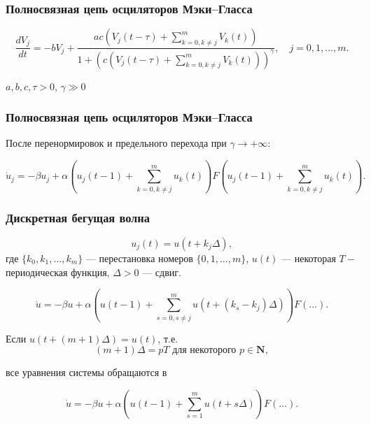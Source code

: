 \begin{frame}
	\frametitle{Полносвязная цепь осциляторов Мэки--Гласса}
	
	\begin{equation*}
		\label{eq:system_full_generators}
		\dfrac{d V_{j}}{dt}=- bV_{j} + \dfrac{ac\left(V_{j}(t - \tau) + \sum\limits_{k = 0, k\neq j}^{m}V_{k}(t)\right)}{1 + \left(c\left(V_{j}(t - \tau) + \sum\limits_{k = 0, k\neq j}^{m}V_{k}(t)\right)\right)^{\gamma}}, \quad j=0,1,\ldots,m.
	\end{equation*}
	
	$a, b, c, \tau > 0$, $\gamma \gg 0$
\end{frame}

\begin{frame}
	\frametitle{Полносвязная цепь осциляторов Мэки--Гласса}
	
	После перенормировок и предельного перехода при $\gamma \to +\infty$:
	
	\begin{equation*}
		\dot{u}_j=-\beta u_j+\alpha\left(u_j(t-1)+ \sum\limits_{k=0, k\neq j}^{m} u_{k}(t)\right)F\left(u_j(t-1)+\sum\limits_{k=0, k\neq j}^{m} u_{k}(t)\right).
	\end{equation*}

\end{frame}


\begin{frame}
	\frametitle{Дискретная бегущая волна}
	
	\begin{equation}
		\label{eq:discrete_wave}
		u_j(t) = u(t + k_j\Delta),   
	\end{equation}
	где $\{k_0, k_1, \ldots, k_m\}$ --- перестановка номеров $\{0, 1, \ldots, m\}$, $u(t)$ --- некоторая $T-$периодическая функция, $\Delta > 0$ --- сдвиг.
	
	\small
	\begin{equation}
		\label{eq:mg_relay_0}
		\dot{u} = -\beta u+\alpha\left(u(t-1)+ \sum_{s=0,s\neq j}^{m}u(t+(k_s-k_j)\Delta)\right)F\left(\dots\right).
	\end{equation}
	\normalsize
	
	Если $u(t + (m + 1)\Delta) = u(t)$, т.е. 
	\[(m + 1)\Delta = pT \text{ для некоторого } p \in \mathbf{N},\]
	
	все уравнения системы обращаются в
	
	\small
	\begin{equation}
		\label{eq:mg_relay_0}
		\dot{u} = -\beta u+\alpha\left(u(t - 1) + \sum_{s=1}^{m}u(t + s\Delta)\right)F\left(\dots\right).
	\end{equation}
	\normalsize
	
	
\end{frame}

